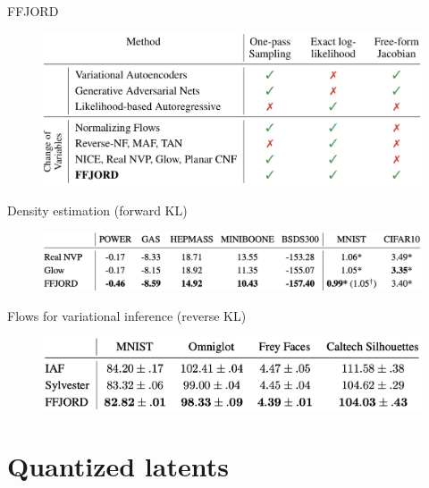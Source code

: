\begin{frame}{FFJORD}
	\begin{figure}
		\centering
		\includegraphics[width=0.75\linewidth]{figs/flow_comparison.png}
	\end{figure}
	\vspace{-0.4cm}
	\begin{block}{Density estimation (forward KL)}
		\vspace{-0.2cm}
		\begin{figure}
			\centering
			\includegraphics[width=0.8\linewidth]{figs/ffjord_forward}
		\end{figure}
		\vspace{-0.5cm}
	\end{block}
	\begin{block}{Flows for variational inference (reverse KL)}
		\vspace{-0.2cm}
		\begin{figure}
			\centering
			\includegraphics[width=0.8\linewidth]{figs/ffjord_reverse}
		\end{figure}
	\end{block}

\end{frame}
\section{Quantized latents}
